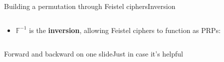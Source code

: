\documentclass[aspectratio=169, lualatex, handout]{beamer}
\begin{document}
\begin{frame}{Building a permutation through Feistel ciphers}{Inversion}
	\begin{columns}[c]
		\begin{column}{0.5\textwidth}
			\begin{itemize}
				\item $\mathbb{F}^{-1}$ is the \textbf{inversion}, allowing Feistel ciphers to function as PRPs:
				      \begin{center}
				      \end{center}
			\end{itemize}
		\end{column}
		\begin{column}{0.5\textwidth}
		\end{column}
	\end{columns}
\end{frame}

\begin{frame}{Forward and backward on one slide}{Just in case it's helpful}
	\begin{columns}[c]
		\begin{column}{0.5\textwidth}
			\begin{center}
			\end{center}
		\end{column}
		\begin{column}{0.5\textwidth}
			\begin{center}
			\end{center}
		\end{column}
	\end{columns}
\end{frame}
\end{document}
